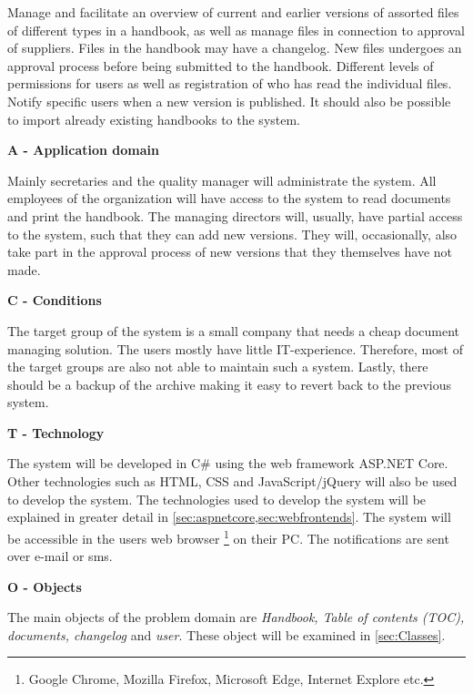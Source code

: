 Manage and facilitate an overview of current and earlier versions of assorted files of different types in a handbook, as well as manage files in connection to approval of suppliers.
Files in the handbook may have a changelog.
New files undergoes an approval process before being submitted to the handbook.
Different levels of permissions for users as well as registration of who has read the individual files.
Notify specific users when a new version is published.
It should also be possible to import already existing handbooks to the system.

\noindent\textbf{A - Application domain}

Mainly secretaries and the quality manager will administrate the system.
All employees of the organization will have access to the system to read documents and print the handbook.
The managing directors will, usually, have partial access to the system, such that they can add new versions.
They will, occasionally, also take part in the approval process of new versions that they themselves have not made.

\noindent\textbf{C - Conditions} \label{sec:conditions}

The target group of the system is a small company that needs a cheap document managing solution.
The users mostly have little IT-experience.
Therefore, most of the target groups are also not able to maintain such a system.
Lastly, there should be a backup of the archive making it easy to revert back to the previous system.

\noindent\textbf{T - Technology}

The system will be developed in C\# using the web framework ASP.NET Core.
Other technologies such as HTML, CSS and JavaScript/jQuery will also be used to develop the system.
The technologies used to develop the system will be explained in greater detail in \cref{sec:aspnetcore,sec:webfrontends}.
The system will be accessible in the users web browser \footnote{Google Chrome, Mozilla Firefox, Microsoft Edge, Internet Explore etc.} on their PC.
The notifications are sent over e-mail or sms.

\noindent\textbf{O - Objects}

The main objects of the problem domain are \textit{Handbook, Table of contents (TOC), documents, changelog} and \textit{user}.
These object will be examined in \cref{sec:Classes}.

